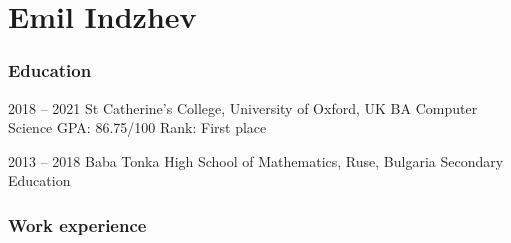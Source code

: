 \documentclass{tccv}
\begin{document}
\part{Emil Indzhev}

\section{Education}

\begin{yearlist}

\item{2018 -- 2021}
     {St Catherine's College, \newline
     University of Oxford, UK}
     {BA Computer Science \newline
     GPA: 86.75/100 \newline
     Rank: First place}

\item{2013 -- 2018}
     {Baba Tonka High School of Mathematics, Ruse, Bulgaria}
     {Secondary Education}

\end{yearlist}

\section{Work experience}
\end{document}
